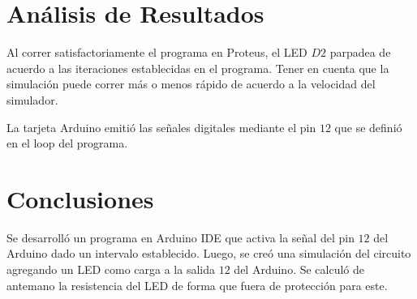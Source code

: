 \documentclass{article}
\begin{document}
\section{Análisis de Resultados}

Al correr satisfactoriamente el programa en Proteus, el LED $D2$ parpadea de acuerdo a las iteraciones establecidas en el programa. Tener en cuenta que la simulación puede correr más o menos rápido de acuerdo a la velocidad del simulador.

\bigbreak

La tarjeta Arduino emitió las señales digitales mediante el pin $12$ que se definió en el loop del programa.

\section{Conclusiones}

Se desarrolló un programa en Arduino IDE que activa la señal del pin $12$ del Arduino dado un intervalo establecido. Luego, se creó una simulación del circuito agregando un LED como carga a la salida $12$ del Arduino. Se calculó de antemano la resistencia del LED de forma que fuera de protección para este.

\printbibliography
\end{document}
